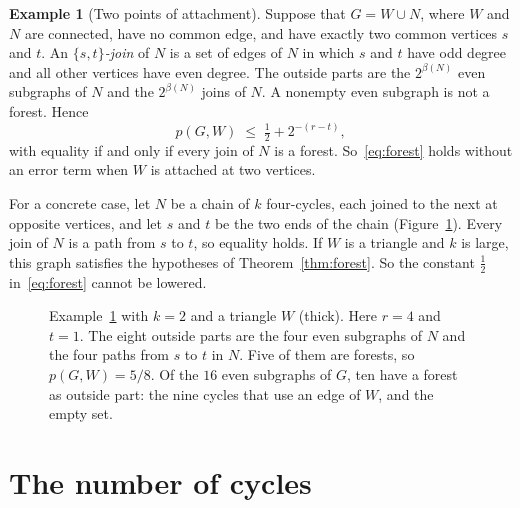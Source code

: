 \documentclass[11pt]{article}
\theoremstyle{definition}
\newtheorem{example}[theorem]{Example}
\theoremstyle{remark}
\newcommand{\half}{\tfrac12}
\begin{document}
\begin{example}[Two points of attachment]\label{rem:twoports}
Suppose that $G=W\cup N$, where $W$ and $N$ are connected, have no common edge, and have exactly two
common vertices $s$ and $t$. An \emph{$\{s,t\}$-join} of $N$ is a set of edges of $N$ in which $s$
and $t$ have odd degree and all other vertices have even degree. The outside parts are the
$2^{\beta(N)}$ even subgraphs of $N$ and the $2^{\beta(N)}$ joins of $N$. A nonempty even subgraph
is not a forest. Hence
\[
  p(G,W)\;\le\;\tfrac12+2^{-(r-t)},
\]
with equality if and only if every join of $N$ is a forest. So~\eqref{eq:forest} holds without an
error term when $W$ is attached at two vertices.

For a concrete case, let $N$ be a chain of $k$ four-cycles, each joined to the next at opposite
vertices, and let $s$ and $t$ be the two ends of the chain (Figure~\ref{fig:twoports}). Every join
of $N$ is a path from $s$ to $t$, so equality holds. If $W$ is a triangle and $k$ is large, this
graph satisfies the hypotheses of Theorem~\ref{thm:forest}. So the constant $\half$
in~\eqref{eq:forest} cannot be lowered.
\end{example}

\begin{figure}[ht]
\centering
{}
\caption{Example~\ref{rem:twoports} with $k=2$ and a triangle $W$ (thick). Here $r=4$ and $t=1$.
The eight outside parts are the four even subgraphs of $N$ and the four paths from $s$ to $t$ in
$N$. Five of them are forests, so $p(G,W)=5/8$. Of the $16$ even subgraphs of $G$, ten have a forest
as outside part: the nine cycles that use an edge of $W$, and the empty set.}
\label{fig:twoports}
\end{figure}

\section{The number of cycles}\label{sec:cycles}
\end{document}
